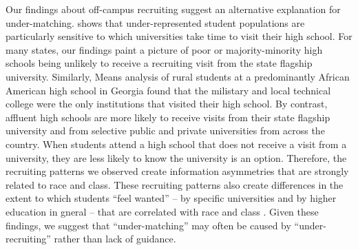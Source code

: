 \documentclass[twoside]{article}
\begin{document}
Our findings about off-campus recruiting suggest an alternative explanation for under-matching. \cite{RN4324} shows that under-represented student populations are particularly sensitive to which universities take time to visit their high school.  For many states, our findings paint a picture of poor or majority-minority high schools being unlikely to receive a recruiting visit from the state flagship university. Similarly, Means \cite{RN4420} analysis of rural students at a predominantly African American high school in Georgia found that the milistary and local technical college were the only institutions that visited their high school. By contrast, affluent high schools are more likely to receive visits from their state flagship university and from selective public and private universities from across the country.  When students attend a high school that does not receive a visit from a university, they are less likely to know the university is an option.  Therefore, the recruiting patterns we observed create information asymmetries that are strongly related to race and class.  These recruiting patterns also create differences in the extent to which students ``feel wanted'' -- by specific universities and by higher education in gneral -- that are correlated with race and class \citep{RN4324}.  Given these findings, we suggest that ``under-matching'' may often be caused by ``under-recruiting'' rather than lack of guidance.
\end{document}
